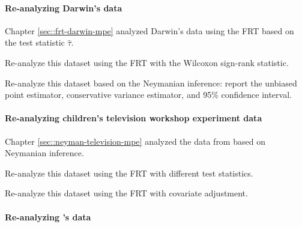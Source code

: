 \paragraph{Re-analyzing Darwin's data}

 
Chapter \ref{sec::frt-darwin-mpe} analyzed Darwin's data using the FRT based on the test statistic $\hat{\tau}$.

Re-analyze this dataset using the FRT with the Wilcoxon sign-rank statistic.

Re-analyze this dataset based on the Neymanian inference: report the unbiased point estimator, conservative variance estimator, and 95\% confidence interval.

\paragraph{Re-analyzing children's television workshop experiment data}

Chapter \ref{sec::neyman-television-mpe} analyzed the data from based on Neymanian inference.

Re-analyze this dataset using the FRT with different test statistics. 

Re-analyze this dataset using the FRT with covariate adjustment.




\paragraph{Re-analyzing \citet{angrist2009effects}'s data}\label{para::AL-mpe-neyman}

